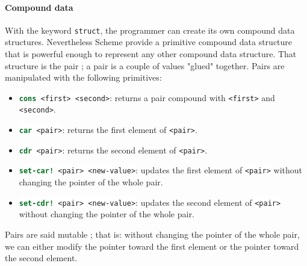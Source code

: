 \documentclass[a4paper]{report}
\newcommand{\ischeme}[1]{\colorbox{white}{\lstinline[language=scheme]&#1&}} %
\begin{document}
\begin{appendices}
\paragraph{Compound data} With the keyword \ischeme{struct}, the programmer can create its own compound data structures. Nevertheless Scheme provide a primitive compound data structure that is powerful enough to represent any other compound data structure. That structure is the pair ; a pair is a couple of values "glued" together. Pairs are manipulated with the following primitives:
\begin{itemize}
\item \ischeme{cons <first> <second>}: returns a pair compound with \ischeme{<first>} and \ischeme{<second>}.
\item \ischeme{car <pair>}: returns the first element of \ischeme{<pair>}.
\item \ischeme{cdr <pair>}: returns the second element of \ischeme{<pair>}.
\item \ischeme{set-car! <pair> <new-value>}: updates the first element of \ischeme{<pair>} without changing the pointer of the whole pair.
\item \ischeme{set-cdr! <pair> <new-value>}: updates the second element of \ischeme{<pair>} without changing the pointer of the whole pair.
\end{itemize}
Pairs are said mutable ; that is: without changing the pointer of the whole pair, we can either modify the pointer toward the first element or the pointer toward the second element.


\end{appendices}
\end{document}
